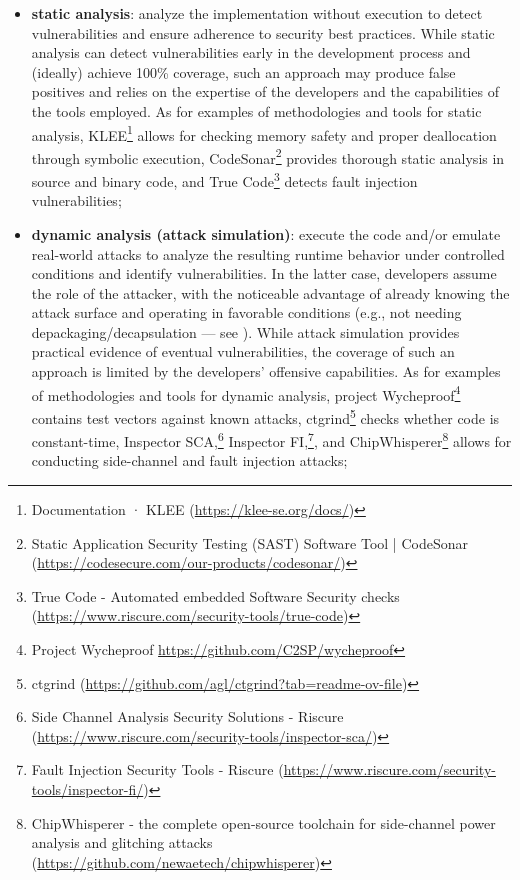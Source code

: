 \begin{itemize}
		
	\item \textbf{static analysis}: analyze the implementation without execution to detect vulnerabilities and ensure adherence to security best practices. While static analysis can detect vulnerabilities early in the development process and (ideally) achieve 100\% coverage, such an approach may produce false positives and relies on the expertise of the developers and the capabilities of the tools employed. As for examples of methodologies and tools for static analysis, KLEE\footnote{Documentation · KLEE (\url{https://klee-se.org/docs/})} \cite{cadar_klee_2008,erlingsson_efficient_2011} allows for checking memory safety and proper deallocation through symbolic execution, CodeSonar\footnote{Static Application Security Testing (SAST) Software Tool | CodeSonar (\url{https://codesecure.com/our-products/codesonar/})} provides thorough static analysis in source and binary code, and True Code\footnote{True Code - Automated embedded Software Security checks (\url{https://www.riscure.com/security-tools/true-code})} detects fault injection vulnerabilities;
	
	\item \textbf{dynamic analysis (attack simulation)}: execute the code and/or emulate real-world attacks to analyze the resulting runtime behavior under controlled conditions and identify vulnerabilities. In the latter case, developers assume the role of the attacker, with the noticeable advantage of already knowing the attack surface and operating in favorable conditions (e.g., not needing depackaging/decapsulation --- see ). While attack simulation provides practical evidence of eventual vulnerabilities, the coverage of such an approach is limited by the developers' offensive capabilities. As for examples of methodologies and tools for dynamic analysis, project Wycheproof\footnote{Project Wycheproof \url{https://github.com/C2SP/wycheproof}} contains test vectors against known attacks, ctgrind\footnote{ctgrind (\url{https://github.com/agl/ctgrind?tab=readme-ov-file})} checks whether code is constant-time, Inspector SCA,\footnote{Side Channel Analysis Security Solutions - Riscure (\url{https://www.riscure.com/security-tools/inspector-sca/})} Inspector FI,\footnote{Fault Injection Security Tools - Riscure (\url{https://www.riscure.com/security-tools/inspector-fi/})}, and ChipWhisperer\footnote{ChipWhisperer - the complete open-source toolchain for side-channel power analysis and glitching attacks (\url{https://github.com/newaetech/chipwhisperer})} allows for conducting side-channel and fault injection attacks;
		

\end{itemize}
